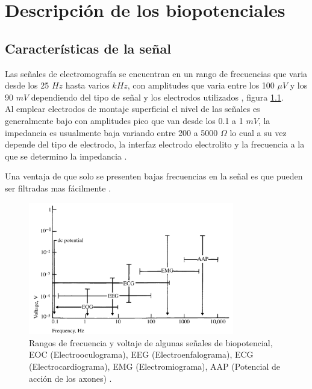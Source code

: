 \chapter{Descripción de los biopotenciales} 
\section{Características de la señal}
Las señales de electromografía se encuentran en un rango de frecuencias que varia desde los 25 $Hz$ hasta varios $kHz$, con amplitudes que varia entre los 100 $\mu V$ y los 90 $mV$ dependiendo del tipo de señal y los electrodos utilizados \cite{webster2009medical}, figura \ref{voltaje_vs_frecuencia}. \\

Al emplear electrodos de montaje superficial el nivel de las señales es generalmente bajo con amplitudes pico que van desde los 0.1 a 1 $mV$, la impedancia es usualmente baja variando entre 200 a 5000 $\Omega$ lo cual a su vez depende del tipo de electrodo, la interfaz electrodo electrolito y la frecuencia a la que se determino la impedancia \cite{webster2009medical}.

Una ventaja de que solo se presenten bajas frecuencias en la señal es que pueden ser filtradas mas fácilmente \cite{webster2009medical}.

\begin{figure}[H]
  \centering
  \includegraphics[width=0.8\textwidth]{Capitulo_1/voltaje_vs_frecuencia.png}
  \caption{Rangos de frecuencia y voltaje de algunas señales de biopotencial, EOC (Electrooculograma), EEG (Electroenfalograma), ECG (Electrocardiograma), EMG (Electromiograma), AAP (Potencial de acción de los axones) \cite{webster2009medical}.}
  \label{voltaje_vs_frecuencia} 
\end{figure}
